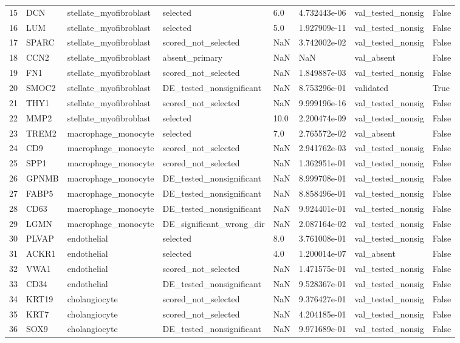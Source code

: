 \documentclass[
  letterpaper,
  DIV=11,
  numbers=noendperiod]{scrartcl}
\begin{document}
{\begin{longtable}[]{@{}llllllll@{}}
15 & DCN & stellate\_myofibroblast & selected & 6.0 & 4.732443e-06 &
val\_tested\_nonsig & False \\
16 & LUM & stellate\_myofibroblast & selected & 5.0 & 1.927909e-11 &
val\_tested\_nonsig & False \\
17 & SPARC & stellate\_myofibroblast & scored\_not\_selected & NaN &
3.742002e-02 & val\_tested\_nonsig & False \\
18 & CCN2 & stellate\_myofibroblast & absent\_primary & NaN & NaN &
val\_absent & False \\
19 & FN1 & stellate\_myofibroblast & scored\_not\_selected & NaN &
1.849887e-03 & val\_tested\_nonsig & False \\
20 & SMOC2 & stellate\_myofibroblast & DE\_tested\_nonsignificant & NaN
& 8.753296e-01 & validated & True \\
21 & THY1 & stellate\_myofibroblast & scored\_not\_selected & NaN &
9.999196e-16 & val\_tested\_nonsig & False \\
22 & MMP2 & stellate\_myofibroblast & selected & 10.0 & 2.200474e-09 &
val\_tested\_nonsig & False \\
23 & TREM2 & macrophage\_monocyte & selected & 7.0 & 2.765572e-02 &
val\_absent & False \\
24 & CD9 & macrophage\_monocyte & scored\_not\_selected & NaN &
2.941762e-03 & val\_tested\_nonsig & False \\
25 & SPP1 & macrophage\_monocyte & scored\_not\_selected & NaN &
1.362951e-01 & val\_tested\_nonsig & False \\
26 & GPNMB & macrophage\_monocyte & DE\_tested\_nonsignificant & NaN &
8.999708e-01 & val\_tested\_nonsig & False \\
27 & FABP5 & macrophage\_monocyte & DE\_tested\_nonsignificant & NaN &
8.858496e-01 & val\_tested\_nonsig & False \\
28 & CD63 & macrophage\_monocyte & DE\_tested\_nonsignificant & NaN &
9.924401e-01 & val\_tested\_nonsig & False \\
29 & LGMN & macrophage\_monocyte & DE\_significant\_wrong\_dir & NaN &
2.087164e-02 & val\_tested\_nonsig & False \\
30 & PLVAP & endothelial & selected & 8.0 & 3.761008e-01 &
val\_tested\_nonsig & False \\
31 & ACKR1 & endothelial & selected & 4.0 & 1.200014e-07 & val\_absent &
False \\
32 & VWA1 & endothelial & scored\_not\_selected & NaN & 1.471575e-01 &
val\_tested\_nonsig & False \\
33 & CD34 & endothelial & DE\_tested\_nonsignificant & NaN &
9.528367e-01 & val\_tested\_nonsig & False \\
34 & KRT19 & cholangiocyte & scored\_not\_selected & NaN & 9.376427e-01
& val\_tested\_nonsig & False \\
35 & KRT7 & cholangiocyte & scored\_not\_selected & NaN & 4.204185e-01 &
val\_tested\_nonsig & False \\
36 & SOX9 & cholangiocyte & DE\_tested\_nonsignificant & NaN &
9.971689e-01 & val\_tested\_nonsig & False \\
\end{longtable}
}
\end{document}
